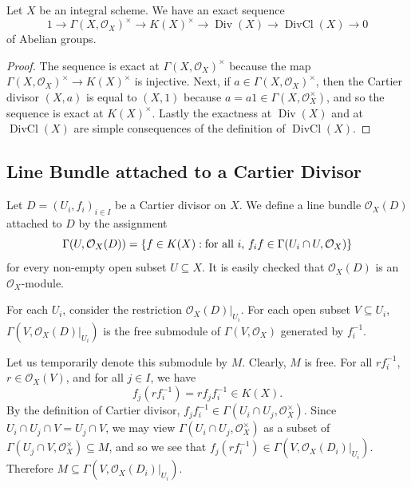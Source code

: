 \documentclass[12pt]{book}
\theoremstyle{definition}
\DeclarePairedDelimiter{\Set}{\lbrace}{\rbrace}
\newcommand{\Div}{\operatorname{Div}}
\newcommand{\DivCl}{\operatorname{DivCl}}
\begin{document}
	\begin{proposition}
		Let $X$ be an integral scheme. We have an exact sequence
		\begin{equation*}
			1 \to \Gamma(X, \mathcal{O}_X)^\times \to K(X)^\times \to \Div(X) \to \DivCl(X) \to 0
		\end{equation*}
		of Abelian groups.
	\end{proposition}
	\begin{proof}
		The sequence is exact at $\Gamma(X, \mathcal{O}_X)^\times$ because the map $\Gamma(X, \mathcal{O}_X)^\times \to K(X)^\times$ is injective. Next, if $a \in \Gamma(X, \mathcal{O}_X)^\times$, then the Cartier divisor $(X, a)$ is equal to $(X, 1)$ because $a = a1 \in\Gamma({X, \mathcal{O}_X^\times})$, and so the sequence is exact at $K(X)^\times$. Lastly the exactness at $\Div(X)$ and at $\DivCl(X)$ are simple consequences of the definition of $\DivCl(X)$.
	\end{proof}
	
	\subsection*{Line Bundle attached to a Cartier Divisor}
	
	Let $D = (U_i, f_i)_{i \in I}$ be a Cartier divisor on $X$. We define a line bundle $\mathcal{O}_X(D)$ attached to $D$ by the assignment
	\begin{equation*}
		\Gamma(U, \mathcal{O}_X(D)) = \Set*{f \in K(X) : \text{for all $i$, } f_if \in \Gamma(U_i \cap U, \mathcal{O}_X)}
	\end{equation*}
	for every non-empty open subset $U \subseteq X$. It is easily checked that $\mathcal{O}_X(D)$ is an $\mathcal{O}_X$-module. 
	
	\begin{remark}
		For each $U_i$, consider the restriction $\mathcal{O}_X(D)|_{U_i}$. For each open subset $V \subseteq U_i$, $\Gamma(V, \mathcal{O}_X(D)|_{U_i})$ is the free submodule of $\Gamma(V, \mathcal{O}_X)$ generated by $f_i^{-1}$.
	\end{remark}
	
	Let us temporarily denote this submodule by $M$. Clearly, $M$ is free. For all $rf_i^{-1}$, $r \in \mathcal{O}_X(V)$, and for all $j \in I$, we have
	\begin{equation*}
		f_j(rf_i^{-1}) = rf_jf_i^{-1} \in K(X).
	\end{equation*} 
	By the definition of Cartier divisor, $f_jf_i^{-1} \in \Gamma(U_i \cap U_j, \mathcal{O}_X^\times)$. Since $U_i \cap U_j \cap V = U_j \cap V$, we may view $\Gamma(U_i \cap U_j, \mathcal{O}_X^\times)$ as a subset of $\Gamma(U_j \cap V, \mathcal{O}_X^\times) \subseteq M$, and so we see that $f_j(rf_i^{-1}) \in \Gamma(V, \mathcal{O}_X(D_i)|_{U_i})$. Therefore $M \subseteq \Gamma(V, \mathcal{O}_X(D_i)|_{U_i})$.
	
\end{document}
